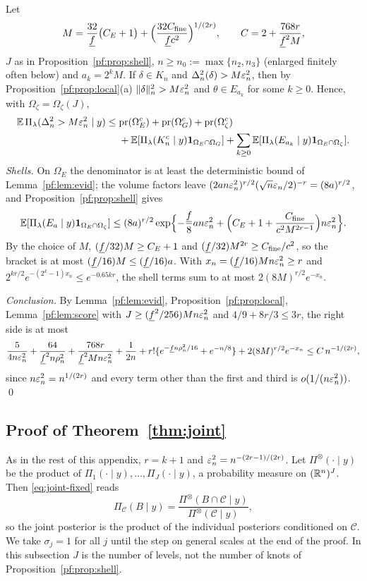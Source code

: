 Let
\[
M=\frac{32}{\underline f}\bigl(C_E+1\bigr)+\Bigl(\frac{32C_{\rm fine}}{\underline f c^2}\Bigr)^{1/(2r)},\qquad C=2+\frac{768r}{\underline f^2M},
\]
$J$ as in Proposition~\ref{pf:prop:shell}, $n\ge n_0:=\max\{n_2,n_3\}$ (enlarged finitely often below) and $a_k=2^kM$. If $\delta\in K_n$ and $\Delta_n^2(\delta)>M\varepsilon_n^2$, then by Proposition~\ref{pf:prop:local}(a) $\|\delta\|_n^2>M\varepsilon_n^2$ and $\theta\in E_{a_k}$ for some $k\ge0$. Hence, with $\Omega_\zeta=\Omega_\zeta(J)$,
\begin{align*}
\mathbb{E}\,\Pi_\lambda(\Delta_n^2>M\varepsilon_n^2\mid y)\le{}&\mathrm{pr}(\Omega_E^c)+\mathrm{pr}(\Omega_G^c)+\mathrm{pr}(\Omega_\zeta^c)\\
&+\mathbb{E}[\Pi_\lambda(K_n^c\mid y)\mathbf 1_{\Omega_E\cap\Omega_G}]+\sum_{k\ge0}\mathbb{E}[\Pi_\lambda(E_{a_k}\mid y)\mathbf 1_{\Omega_E\cap\Omega_\zeta}].
\end{align*}
\emph{Shells.} On $\Omega_E$ the denominator is at least the deterministic bound of Lemma~\ref{pf:lem:evid}; the volume factors leave $(2an\varepsilon_n^2)^{r/2}(\sqrt n\varepsilon_n/2)^{-r}=(8a)^{r/2}$, and Proposition~\ref{pf:prop:shell} gives
\[
\mathbb{E}[\Pi_\lambda(E_a\mid y)\mathbf 1_{\Omega_E\cap\Omega_\zeta}]\le(8a)^{r/2}\exp\Bigl\{-\frac{\underline f}8an\varepsilon_n^2+\Bigl(C_E+1+\frac{C_{\rm fine}}{c^2M^{2r-1}}\Bigr)n\varepsilon_n^2\Bigr\}.
\]
By the choice of $M$, $(\underline f/32)M\ge C_E+1$ and $(\underline f/32)M^{2r}\ge C_{\rm fine}/c^2$, so the bracket is at most $(\underline f/16)M\le(\underline f/16)a$. With $x_n=(\underline f/16)Mn\varepsilon_n^2\ge r$ and $2^{kr/2}e^{-(2^k-1)x_n}\le e^{-0.65kr}$, the shell terms sum to at most $2(8M)^{r/2}e^{-x_n}$.

\emph{Conclusion.} By Lemma~\ref{pf:lem:evid}, Proposition~\ref{pf:prop:local}, Lemma~\ref{pf:lem:score} with $J\ge(\underline f^2/256)Mn\varepsilon_n^2$ and $4/9+8r/3\le3r$, the right side is at most
\[
\frac5{4n\varepsilon_n^2}+\frac{64}{\underline f^2n\rho_n^2}+\frac{768r}{\underline f^2Mn\varepsilon_n^2}+\frac1{2n}+r!\{e^{-\underline f n\rho_n^2/16}+e^{-n/8}\}+2(8M)^{r/2}e^{-x_n}\le C\,n^{-1/(2r)},
\]
since $n\varepsilon_n^2=n^{1/(2r)}$ and every term other than the first and third is $o(1/(n\varepsilon_n^2))$. \qed

\subsection{Proof of Theorem~\ref{thm:joint}}\label{pf:sec:joint}

As in the rest of this appendix, $r=k+1$ and $\varepsilon_n^2=n^{-(2r-1)/(2r)}$. Let $\Pi^{\otimes}(\cdot\mid y)$ be the product of $\Pi_1(\cdot\mid y),\dots,\Pi_J(\cdot\mid y)$, a probability measure on $(\mathbb{R}^n)^J$. Then \eqref{eq:joint-fixed} reads
\[
\Pi_{\mathcal C}(B\mid y)=\frac{\Pi^{\otimes}(B\cap\mathcal C\mid y)}{\Pi^{\otimes}(\mathcal C\mid y)} ,
\]
so the joint posterior is the product of the individual posteriors conditioned on $\mathcal C$. We take $\sigma_j=1$ for all $j$ until the step on general scales at the end of the proof. In this subsection $J$ is the number of levels, not the number of knots of Proposition~\ref{pf:prop:shell}.

